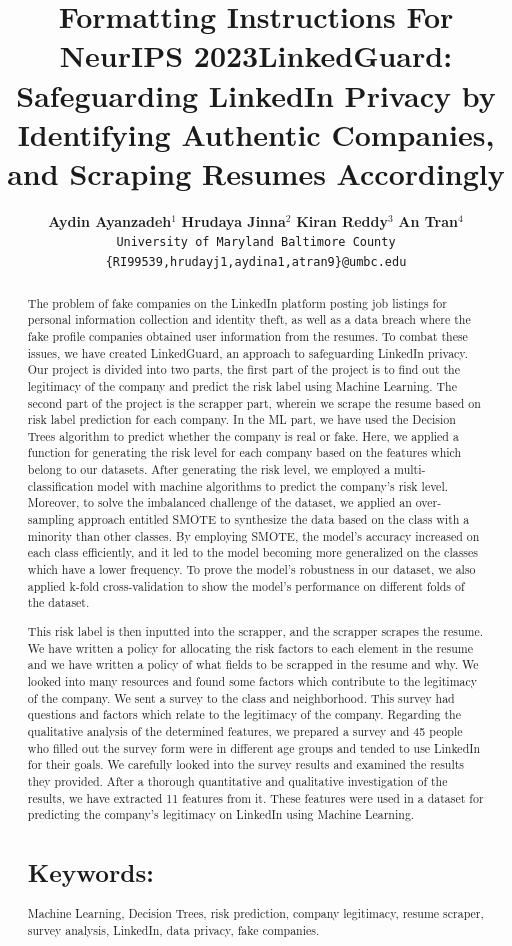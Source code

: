 \documentclass{article}
\title{Formatting Instructions For NeurIPS 2023}
\title{LinkedGuard: Safeguarding LinkedIn Privacy by Identifying Authentic Companies, and Scraping Resumes Accordingly}
\author{%

\textbf{Aydin Ayanzadeh}$^1$ \quad \textbf{Hrudaya Jinna}$^2$ \quad \textbf{Kiran Reddy}$^3$ \quad \textbf{An Tran}$^4$\\
\texttt{University of Maryland Baltimore County}\\


\texttt{\{RI99539,hrudayj1,aydina1,atran9\}@umbc.edu}\\

}
\begin{document}
\nolinenumbers
\maketitle


\begin{abstract}
The problem of fake companies on the LinkedIn platform posting job listings for personal information collection and identity theft, as well as a data breach where the fake profile companies obtained user information from the resumes. To combat these issues, we have created LinkedGuard, an approach to safeguarding LinkedIn privacy. Our project is divided into two parts, the first part of the project is to find out the legitimacy of the company and predict the risk label using Machine Learning. The second part of the project is the scrapper part, wherein we scrape the resume based on risk label prediction for each company. In the ML part, we have used the Decision Trees algorithm to predict whether the company is real or fake. Here, we applied a function for generating the risk level for each company based on the features which belong to our datasets. After generating the risk level, we employed a multi-classification model with machine algorithms to predict the company's risk level. Moreover, to solve the imbalanced challenge of the dataset, we applied an over-sampling approach entitled SMOTE to synthesize the data based on the class with a minority than other classes. By employing SMOTE, the model's accuracy increased on each class efficiently, and it led to the model becoming more generalized on the classes which have a lower frequency. To prove the model's robustness in our dataset, we also applied k-fold cross-validation to show the model's performance on different folds of the dataset.


This risk label is then inputted into the scrapper, and the scrapper scrapes the resume. We have written a policy for allocating the risk factors to each element in the resume and we have written a policy of what fields to be scrapped in the resume and why. We looked into many resources and found some factors which contribute to the legitimacy of the company. We sent a survey to the class and neighborhood. This survey had questions and factors which relate to the legitimacy of the company. Regarding the qualitative analysis of the determined features, we prepared a survey and 45 people who filled out the survey form were in different age groups and tended to use LinkedIn for their goals. We carefully looked into the survey results and examined the results they provided. After a thorough quantitative and qualitative investigation of the results, we have extracted 11 features from it. These features were used in a dataset for predicting the company's legitimacy on LinkedIn using Machine Learning.

\section*{Keywords:}
Machine Learning, Decision Trees, risk prediction, company legitimacy, resume scraper, survey analysis, LinkedIn, data privacy, fake companies.
\end{abstract}
\end{document}
